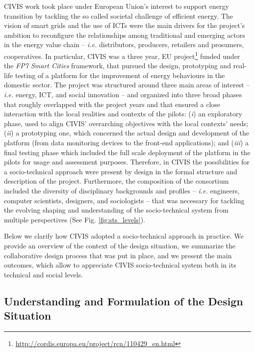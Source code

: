 CIVIS work took place under European Union’s interest to support energy transition by tackling the 
so called societal challenge of efficient energy. The vision of smart grids and the use of ICTs were 
the main drivers for the project's ambition to reconfigure the relationships among traditional and 
emerging actors in the energy value chain -- \textit{i.e.} distributors, producers, retailers and 
prosumers, cooperatives. In particular, CIVIS was a three year, EU 
project\footnote{\url{http://cordis.europa.eu/project/rcn/110429\_en.html}} funded under the 
\textit{FP7 Smart Cities} framework, that pursued the design, prototyping and real-life testing of 
a platform for the improvement of energy behaviours in the domestic sector. The project was 
structured around three main areas of interest -- \textit{i.e.} energy, ICT, and social innovation 
-- and organized into three broad phases that roughly overlapped with the project years and that 
ensured a close interaction with the local realities and contexts of the pilots: (\textit{i}) an 
exploratory phase, used to align CIVIS’ overarching objectives with the local contexts’ needs;
(\textit{ii}) a prototyping one, which concerned the actual design and development of the platform 
(from data monitoring devices to the front-end applications); and (\textit{iii}) a final testing 
phase which included the full scale deployment of the platform in the pilots for usage and 
assessment purposes.
Therefore, in CIVIS the possibilities for a socio-technical approach were present by design
in the formal structure and description of the project.
Furthermore, the composition of the consortium included the diversity of disciplinary backgrounds
and profiles -- \textit{i.e.} engineers, computer scientists, designers, and sociologists --
that was necessary for tackling the evolving shaping and
understanding of the socio-technical system from multiple perspectives (See Fig. \ref{fig:sts_levels}).

Below we clarify how CIVIS adopted %
a socio-technical approach in practice. We provide an overview of the context of the design situation,
we summarize the collaborative design process that was put in place, and we present
the main outcomes, which allow to appreciate CIVIS socio-technical system both in
its technical and social levels.  

\subsection{Understanding and Formulation of the Design Situation}

